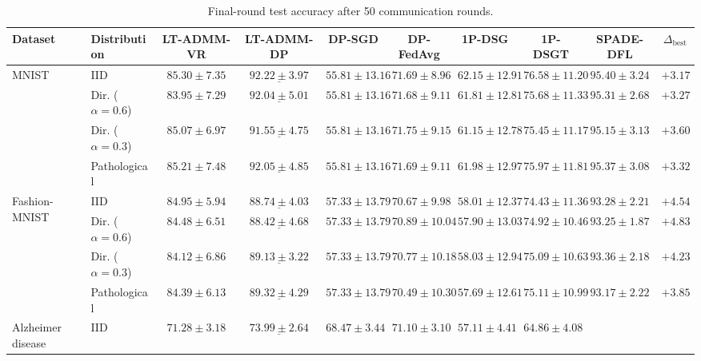 \begin{table}[htbp!]
\centering
\caption{Final-round test accuracy after 50 communication rounds.}
\label{tab:distribution_final_accuracy}
\scriptsize
\setlength{\tabcolsep}{2.2pt}
\renewcommand{\arraystretch}{0.90}
\begin{tabular*}{\textwidth}{@{\extracolsep{\fill}}llcccccccc@{}}
\toprule
Dataset & Distribution
& LT-ADMM-VR
& LT-ADMM-DP
& DP-SGD
& DP-FedAvg
& 1P-DSG
& 1P-DSGT
& SPADE-DFL
& $\Delta_{\mathrm{best}}$ \\
\midrule
\multirow{4}{*}{MNIST}
& IID
& $85.30{\pm}7.35$
& $\underline{92.22{\pm}3.97}$
& $55.81{\pm}13.16$
& $71.69{\pm}8.96$
& $62.15{\pm}12.91$
& $76.58{\pm}11.20$
& $\mathbf{95.40{\pm}3.24}$
& $+3.17$ \\
& Dir. ($\alpha=0.6$)
& $83.95{\pm}7.29$
& $\underline{92.04{\pm}5.01}$
& $55.81{\pm}13.16$
& $71.68{\pm}9.11$
& $61.81{\pm}12.81$
& $75.68{\pm}11.33$
& $\mathbf{95.31{\pm}2.68}$
& $+3.27$ \\
& Dir. ($\alpha=0.3$)
& $85.07{\pm}6.97$
& $\underline{91.55{\pm}4.75}$
& $55.81{\pm}13.16$
& $71.75{\pm}9.15$
& $61.15{\pm}12.78$
& $75.45{\pm}11.17$
& $\mathbf{95.15{\pm}3.13}$
& $+3.60$ \\
& Pathological
& $85.21{\pm}7.48$
& $\underline{92.05{\pm}4.85}$
& $55.81{\pm}13.16$
& $71.69{\pm}9.11$
& $61.98{\pm}12.97$
& $75.97{\pm}11.81$
& $\mathbf{95.37{\pm}3.08}$
& $+3.32$ \\
\midrule
\multirow{4}{*}{Fashion-MNIST}
& IID
& $84.95{\pm}5.94$
& $\underline{88.74{\pm}4.03}$
& $57.33{\pm}13.79$
& $70.67{\pm}9.98$
& $58.01{\pm}12.37$
& $74.43{\pm}11.36$
& $\mathbf{93.28{\pm}2.21}$
& $+4.54$ \\
& Dir. ($\alpha=0.6$)
& $84.48{\pm}6.51$
& $\underline{88.42{\pm}4.68}$
& $57.33{\pm}13.79$
& $70.89{\pm}10.04$
& $57.90{\pm}13.03$
& $74.92{\pm}10.46$
& $\mathbf{93.25{\pm}1.87}$
& $+4.83$ \\
& Dir. ($\alpha=0.3$)
& $84.12{\pm}6.86$
& $\underline{89.13{\pm}3.22}$
& $57.33{\pm}13.79$
& $70.77{\pm}10.18$
& $58.03{\pm}12.94$
& $75.09{\pm}10.63$
& $\mathbf{93.36{\pm}2.18}$
& $+4.23$ \\
& Pathological
& $84.39{\pm}6.13$
& $\underline{89.32{\pm}4.29}$
& $57.33{\pm}13.79$
& $70.49{\pm}10.30$
& $57.69{\pm}12.61$
& $75.11{\pm}10.99$
& $\mathbf{93.17{\pm}2.22}$
& $+3.85$ \\
\midrule
\multirow{4}{*}{Alzheimer disease}
& IID
& $71.28{\pm}3.18$
& $\underline{73.99{\pm}2.64}$
& $68.47{\pm}3.44$
& $71.10{\pm}3.10$
& $57.11{\pm}4.41$
& $64.86{\pm}4.08$

\end{tabular*}
\end{table}
